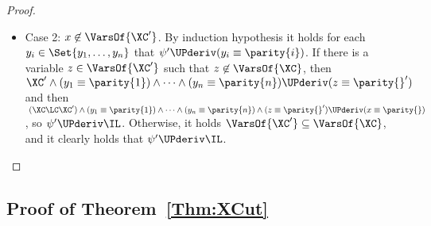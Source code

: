 \begin{proof}
\begin{itemize}
\item Case 2: $ x \not \in \VarsOf{\XC'} $.
By induction hypothesis it holds for each $ y_i \in \Set{y_1, \dots, y_n} $
that $ \psi' \UPderiv (y_i \equiv \parity{i}) $.
If there is a variable $z \in \VarsOf{\XC'}$ such that $ z \not \in
\VarsOf{\XC} $, then $ \XC' \wedge (y_1 \equiv \parity{1}) \wedge \dots \wedge (y_n \equiv \parity{n}) \UPderiv (z \equiv \parity{}') $ and then
$ (\XC \LC \XC') \wedge (y_1 \equiv \parity{1}) \wedge \dots \wedge (y_n \equiv \parity{n}) \wedge (z \equiv \parity{}') \UPderiv (x \equiv \parity{}) $, so $ \psi' \UPderiv \IL $.
Otherwise, it holds $ \VarsOf{\XC'} \subseteq \VarsOf{\XC} $, and it clearly holds that $ \psi' \UPderiv \IL $.
\end{itemize}
\end{proof}

\subsection{Proof of Theorem~\ref{Thm:XCut}}
\newcommand{\CutAp}{V'_\textup{a}}
\newcommand{\CutBp}{V'_\textup{b}}
\newcommand{\xorpartA}{\xorpart^\textup{a}}
\newcommand{\xorpartB}{\xorpart^\textup{b}}
\newcommand{\Iface}{X'}
\newcommand{\Ifaceparity}{\parity{}'}


